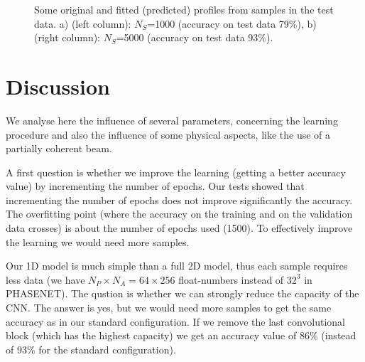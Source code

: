 \documentclass{iucr}
\newcommand{\todo}[1]{{\color{red}[TODO: "#1'']}}
\newcommand{\inred}[1]{{\color{red}#1}}
\begin{document}
\begin{figure}
    \caption{Some original and fitted (predicted) profiles from samples in the test data. a) (left column): $N_S$=1000 (accuracy on test data 79\%), b) (right column): $N_S$=5000 (accuracy on test  data 93\%). 
    }
\end{figure}

\section{Discussion}\label{sec:discussion}

We analyse here the influence of several parameters, concerning the learning procedure and also the influence of some physical aspects, like the use of a partially coherent beam.

A first question is whether we improve the learning (getting a better accuracy value) by incrementing the number of epochs. Our tests showed that incrementing the number of epochs does not improve significantly the accuracy. The overfitting point (where the accuracy on the training and on the validation data crosses) is about the number of epochs used (1500). To effectively improve the learning we would need more samples. 

Our 1D model is much simple than a full 2D model, thus each sample requires less data (we have $N_P\times N_A=64\times 256$ float-numbers instead of $32^3$ in PHASENET). The qustion is whether we can strongly reduce the capacity of the CNN. The answer is yes, but we would need more samples to get the same accuracy as in our standard configuration. If we remove the last convolutional block (which has the highest capacity) we get an accuracy value of 86\% (instead of 93\% for the standard configuration).
\end{document}
